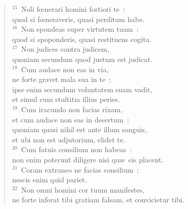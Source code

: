\begin{verse}
${}^{15}$~Noli fœnerari homini fortiori te~:\\ quod si fœneraveris, quasi perditum habe.\\
${}^{16}$~Non spondeas super virtutem tuam~:\\ quod si spoponderis, quasi restituens cogita.\\
${}^{17}$~Non judices contra judicem,\\ quoniam secundum quod justum est judicat.\\
${}^{18}$~Cum audace non eas in via,\\ ne forte gravet mala sua in te~:\\ ipse enim secundum voluntatem suam vadit,\\ et simul cum stultitia illius peries.\\
${}^{19}$~Cum iracundo non facias rixam,\\ et cum audace non eas in desertum~:\\ quoniam quasi nihil est ante illum sanguis,\\ et ubi non est adjutorium, elidet te.\\
${}^{20}$~Cum fatuis consilium non habeas~:\\ non enim poterunt diligere nisi qu\ae\ eis placent.\\
${}^{21}$~Coram extraneo ne facias consilium~:\\ nescis enim quid pariet.\\
${}^{22}$~Non omni homini cor tuum manifestes,\\ ne forte inferat tibi gratiam falsam, et convicietur tibi.\end{verse}


